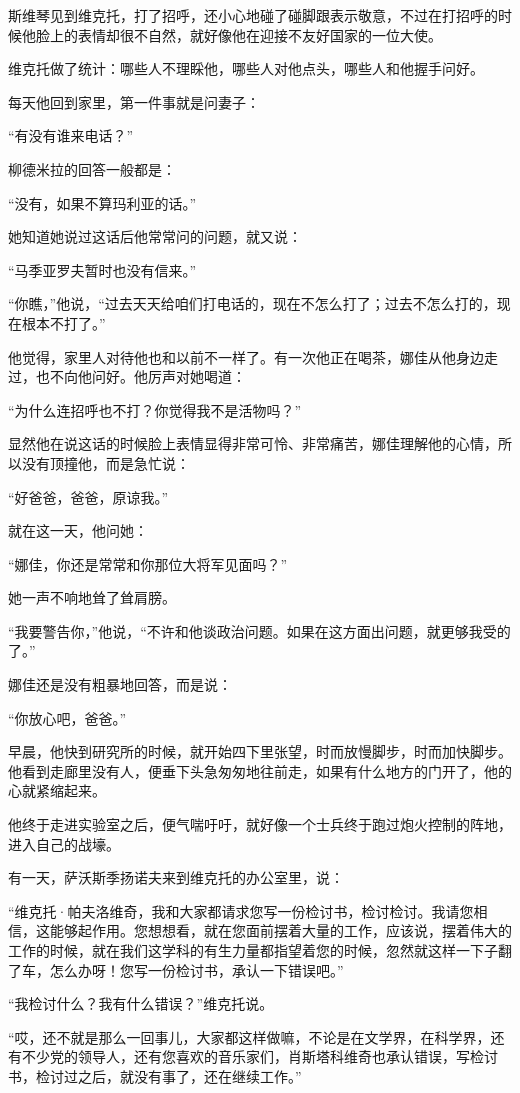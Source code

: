 斯维琴见到维克托，打了招呼，还小心地碰了碰脚跟表示敬意，不过在打招呼的时候他脸上的表情却很不自然，就好像他在迎接不友好国家的一位大使。

维克托做了统计：哪些人不理睬他，哪些人对他点头，哪些人和他握手问好。

每天他回到家里，第一件事就是问妻子：

“有没有谁来电话？”

柳德米拉的回答一般都是：

“没有，如果不算玛利亚的话。”

她知道她说过这话后他常常问的问题，就又说：

“马季亚罗夫暂时也没有信来。”

“你瞧，”他说，“过去天天给咱们打电话的，现在不怎么打了；过去不怎么打的，现在根本不打了。”

他觉得，家里人对待他也和以前不一样了。有一次他正在喝茶，娜佳从他身边走过，也不向他问好。他厉声对她喝道：

“为什么连招呼也不打？你觉得我不是活物吗？”

显然他在说这话的时候脸上表情显得非常可怜、非常痛苦，娜佳理解他的心情，所以没有顶撞他，而是急忙说：

“好爸爸，爸爸，原谅我。”

就在这一天，他问她：

“娜佳，你还是常常和你那位大将军见面吗？”

她一声不响地耸了耸肩膀。

“我要警告你，”他说，“不许和他谈政治问题。如果在这方面出问题，就更够我受的了。”

娜佳还是没有粗暴地回答，而是说：

“你放心吧，爸爸。”

早晨，他快到研究所的时候，就开始四下里张望，时而放慢脚步，时而加快脚步。他看到走廊里没有人，便垂下头急匆匆地往前走，如果有什么地方的门开了，他的心就紧缩起来。

他终于走进实验室之后，便气喘吁吁，就好像一个士兵终于跑过炮火控制的阵地，进入自己的战壕。

有一天，萨沃斯季扬诺夫来到维克托的办公室里，说：

“维克托·帕夫洛维奇，我和大家都请求您写一份检讨书，检讨检讨。我请您相信，这能够起作用。您想想看，就在您面前摆着大量的工作，应该说，摆着伟大的工作的时候，就在我们这学科的有生力量都指望着您的时候，忽然就这样一下子翻了车，怎么办呀！您写一份检讨书，承认一下错误吧。”

“我检讨什么？我有什么错误？”维克托说。

“哎，还不就是那么一回事儿，大家都这样做嘛，不论是在文学界，在科学界，还有不少党的领导人，还有您喜欢的音乐家们，肖斯塔科维奇也承认错误，写检讨书，检讨过之后，就没有事了，还在继续工作。”

